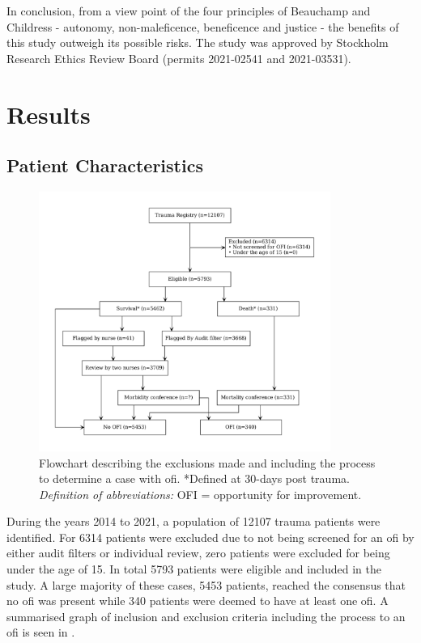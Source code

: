\documentclass[12pt, letterpaper]{article}
\begin{document}
In conclusion, from a view point of the four principles of Beauchamp and Childress - autonomy, non-maleficence, beneficence and justice - the benefits of this study outweigh its possible risks. The study was approved by Stockholm Research Ethics Review Board (permits 2021-02541 and 2021-03531).

\section{Results}
\subsection{Patient Characteristics}
\begin{figure}[h]
    \centering
    \includegraphics[width=0.85\textwidth]{figures/flowchart.pdf}
    \caption{Flowchart describing the exclusions made and including the process to determine a case with \acrshort{ofi}. *Defined at 30-days post trauma. \\
        \textit{Definition of abbreviations:} OFI = opportunity for improvement.}
    \label{fig:flowchart}
\end{figure}
During the years 2014 to 2021, a population of \num{12107} trauma patients were identified. For \num{6314} patients were excluded due to not being screened for an \acrshort{ofi} by either audit filters or individual review, zero patients were excluded for being under the age of 15. In total \num{5793} patients were eligible and included in the study. A large majority of these cases, \num{5453} patients, reached the consensus that no \acrshort{ofi} was present while \num{340} patients were deemed to have at least one \acrshort{ofi}. A summarised graph of inclusion and exclusion criteria including the process to an \acrshort{ofi} is seen in .
\end{document}
